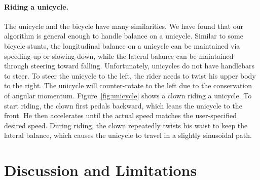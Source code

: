 \paragraph{Riding a unicycle.} The unicycle and the bicycle have many similarities. We have found that our algorithm is general enough to handle balance on a unicycle. Similar to some bicycle stunts, the longitudinal balance on a unicycle can be maintained via speeding-up or slowing-down, while the lateral balance can be maintained through steering toward falling. Unfortunately, unicycles do not have handlebars to steer. To steer the unicycle to the left, the rider needs to twist his upper body to the right. The unicycle will counter-rotate to the left due to the conservation of angular momentum. Figure~\ref{fig:unicycle} shows a clown riding a unicycle. To start riding, the clown first pedals backward, which leans the unicycle to the front. He then accelerates until the actual speed matches the user-specified desired speed. During riding, the clown repeatedly twists his waist to keep the lateral balance, which causes the unicycle to travel in a slightly sinusoidal path.



\section{Discussion and Limitations}
\label{sec:Evaluation}

